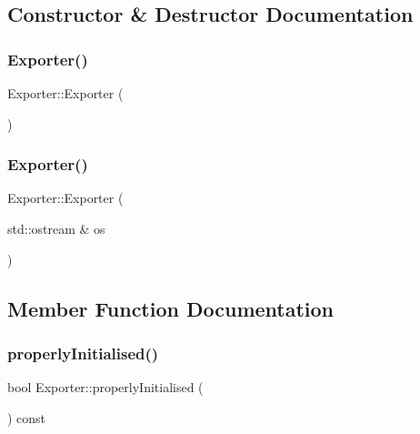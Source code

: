 \subsection{Constructor \& Destructor Documentation}
\mbox{\label{class_exporter_a2a977cb5ac8f637fcb570e73f650eca0}} 
\subsubsection{\texorpdfstring{Exporter()}{Exporter()}\hspace{0.1cm}{\footnotesize\ttfamily [1/2]}}
{\footnotesize\ttfamily Exporter\+::\+Exporter (\begin{DoxyParamCaption}{ }\end{DoxyParamCaption})}

\mbox{\label{class_exporter_aa0dd651db7d938f6bc104c603937c6f2}} 
\subsubsection{\texorpdfstring{Exporter()}{Exporter()}\hspace{0.1cm}{\footnotesize\ttfamily [2/2]}}
{\footnotesize\ttfamily Exporter\+::\+Exporter (\begin{DoxyParamCaption}\item[{std\+::ostream \&}]{os }\end{DoxyParamCaption})}



\subsection{Member Function Documentation}
\mbox{\label{class_exporter_aafd9df9210aeefd7bb7fd434fc317cf0}} 
\subsubsection{\texorpdfstring{properly\+Initialised()}{properlyInitialised()}}
{\footnotesize\ttfamily bool Exporter\+::properly\+Initialised (\begin{DoxyParamCaption}{ }\end{DoxyParamCaption}) const\hspace{0.3cm}{\ttfamily [virtual]}}



